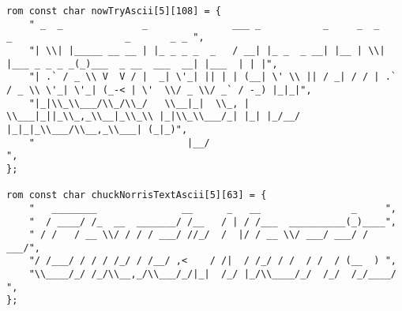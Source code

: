 \begin{lstlisting}
rom const char nowTryAscii[5][108] = {
	" _  _              _               ___ _           _     _  _             _                    _       _ _ ",
	"| \\| |_____ __ __ | |_ _ _ _  _   / __| |_ _  _ __| |__ | \\| |___ _ _ _ _(_)___  _ __  ___  __| |___  | | |",
	"| .` / _ \\ V  V / |  _| \'_| || | | (__| \' \\ || / _| / / | .` / _ \\ \'_| \'_| (_-< | \'  \\/ _ \\/ _` / -_) |_|_|",
	"|_|\\_\\___/\\_/\\_/   \\__|_|  \\_, |  \\___|_||_\\_,_\\__|_\\_\\ |_|\\_\\___/_| |_| |_/__/ |_|_|_\\___/\\__,_\\___| (_|_)",
	"                           |__/                                                                            ",
};

rom const char chuckNorrisTextAscii[5][63] = {
	"   ________               __      _   __                _     ",
	"  / ____/ /_  __  _______/ /__   / | / /___  __________(_)____",
	" / /   / __ \\/ / / / ___/ //_/  /  |/ / __ \\/ ___/ ___/ / ___/",
	"/ /___/ / / / /_/ / /__/ ,<    / /|  / /_/ / /  / /  / (__  ) ",
	"\\____/_/ /_/\\__,_/\\___/_/|_|  /_/ |_/\\____/_/  /_/  /_/____/  ",
};


\end{lstlisting}
